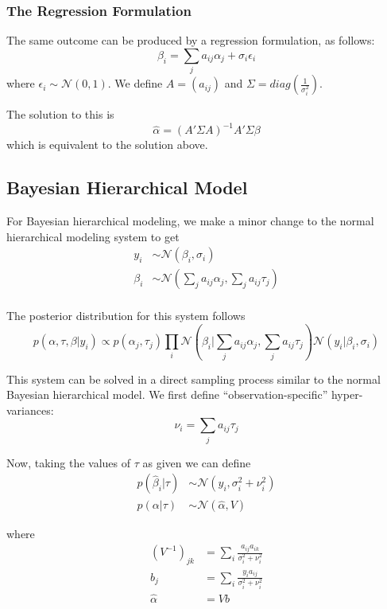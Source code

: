 \documentclass[12pt, oneside]{amsart}
\begin{document}
\subsubsection{The Regression Formulation}

The same outcome can be produced by a regression formulation, as
follows:
\[
\beta_i = \sum_j a_{ij} \alpha_j + \sigma_i \epsilon_i
\]
where $\epsilon_i \sim \mathcal{N}(0, 1)$.  We define $A =
\left(a_{ij}\right)$ and $\Sigma = diag\left(\frac{1}{\sigma_i^2}\right)$.

The solution to this is
\[
\hat\alpha = \left(A' \Sigma A\right)^{-1} A' \Sigma \beta
\]
which is equivalent to the solution above.

\subsection{Bayesian Hierarchical Model}

For Bayesian hierarchical modeling, we make a minor change to the
normal hierarchical modeling system to get
\begin{align*}
  y_i & \sim \mathcal{N}\left(\beta_i, \sigma_i\right) \\
  \beta_i & \sim \mathcal{N}\left(\sum_j a_{ij} \alpha_j, \sum_j a_{ij} \tau_j\right) \\
\end{align*}

The posterior distribution for this system follows
\[
p(\alpha, \tau, \beta | y_i) \propto
p(\alpha_j, \tau_j) \prod_i \mathcal{N}\left(\beta_i | \sum_j
  a_{ij} \alpha_j, \sum_j a_{ij} \tau_j\right)
\mathcal{N}\left(y_i | \beta_i, \sigma_i\right)
\]

This system can be solved in a direct sampling process similar to the normal
Bayesian hierarchical model.  We first define ``observation-specific''
hyper-variances:
\[
\nu_i = \sum_j a_{ij} \tau_j
\]

Now, taking the values of $\tau$ as given we can define
\begin{align*}
  p(\hat\beta_i | \tau) & \sim \mathcal{N}\left(y_i, \sigma_i^2 +
                              \nu_i^2\right) \\
  p(\alpha | \tau) & \sim \mathcal{N}\left(\hat\alpha, V\right)
\end{align*}

where
\begin{align*}
  \left(V^{-1}\right)_{jk} &= \sum_i \frac{a_{ij} a_{ik}}{\sigma_i^2 +
                             \nu_i^2} \\
  b_j &= \sum_i \frac{y_i a_{ij}}{\sigma_i^2 + \nu_i^2} \\
  \hat\alpha &= V b
\end{align*}
\end{document}
